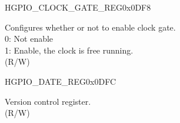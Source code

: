 \begin{register}{H}{GPIO\_CLOCK\_GATE\_REG}{0x0DF8}\label{regdesc:GPIOCLOCKGATEREG}
%
%
\regnewline%
\begin{regdesc}\begin{reglist}
\label{fielddesc:GPIOCLKEN}\item [GPIO\_CLK\_EN] Configures whether or not to enable clock gate.\\
0: Not enable\\
1: Enable, the clock is free running. \\ (R/W)
\end{reglist}\end{regdesc}
\end{register}


\begin{register}{H}{GPIO\_DATE\_REG}{0x0DFC}\label{regdesc:GPIODATEREG}
%
%
\regnewline%
\begin{regdesc}\begin{reglist}
\label{fielddesc:GPIODATE}\item [GPIO\_DATE] Version control register. \\ (R/W)
\end{reglist}\end{regdesc}
\end{register}


